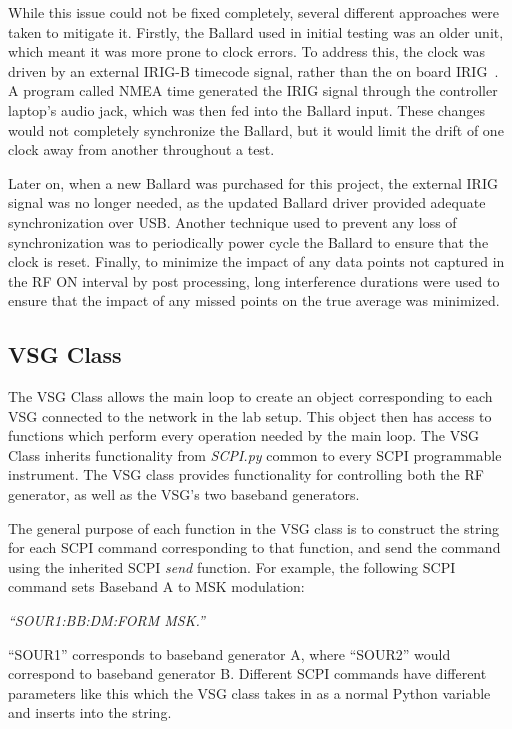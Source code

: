 While this issue could not be fixed completely, several different approaches were taken to mitigate it. Firstly, the Ballard used in initial testing was an older unit, which meant it was more prone to clock errors. To address this, the clock was driven by an external IRIG-B timecode signal, rather than the on board IRIG~\cite{noauthor_overview_2017}. A program called NMEA time generated the IRIG signal through the controller laptop's audio jack, which was then fed into the Ballard input.  These changes would not completely synchronize the Ballard, but it would limit the drift of one clock away from another throughout a test. 


Later on, when a new Ballard was purchased for this project, the external IRIG signal was no longer needed, as the updated Ballard driver provided adequate synchronization over USB. Another technique used to prevent any loss of synchronization was to periodically power cycle the Ballard to ensure that the clock is reset. Finally, to minimize the impact of any data points not captured in the RF ON interval by post processing, long interference durations were used to ensure that the impact of any missed points on the true average was minimized. 

\subsection{VSG Class}
The VSG Class allows the main loop to create an object corresponding to each VSG connected to the network in the lab setup. This object then has access to functions which perform every operation needed by the main loop. The VSG Class inherits functionality from \textit{SCPI.py} common to every SCPI programmable instrument. The VSG class provides functionality for controlling both the RF generator, as well as the VSG's two baseband generators. 

The general purpose of each function in the VSG class is to construct the string for each SCPI command corresponding to that function, and send the command using the inherited SCPI \textit{send} function. For example, the following SCPI command sets Baseband A to MSK modulation:
\begin{center}
\textit{``SOUR1:BB:DM:FORM	MSK.''}
\end{center}
``SOUR1'' corresponds to baseband generator A, where ``SOUR2'' would correspond to baseband generator B. Different SCPI commands have different parameters like this which the VSG class takes in as a normal Python variable and inserts into the string. 


